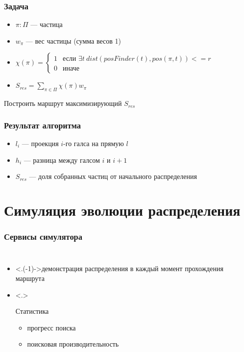\documentclass{beamer} %
\theoremstyle{definition} %
\begin{document}
\begin{frame}
  \frametitle{Задача}
\begin{itemize}
  \item {$\pi : \Pi$ --- частица}
  \item {$w_{\pi}$ --- вес частицы (сумма весов 1)}
  \item {$\chi(\pi) = 
	\left\{
		\begin{array}{ll}
			1 & \mbox{если } {\exists t\ {dist(posFinder(t), pos(\pi, t)) <= r}}\\
			0 & \mbox{иначе }
		\end{array}
	\right.$
        }
  \item {$S_{res}=\sum\limits_{\pi \in \Pi}{\chi(\pi)w_{\pi}}$}
\end{itemize}
  Построить маршрут максимизирующий $S_{res}$
\end{frame}

\begin{frame}
  \frametitle{Результат алгоритма}
\begin{itemize}
  \item $l_i$ --- проекция $i$-го галса на прямую $l$
  \item $h_i$ --- разница между галсом $i$ и $i+1$
  \item $S_{res}$ --- доля собранных частиц от начального распределения
\end{itemize}

\end{frame}

\section{Симуляция эволюции распределения} %
\begin{frame}
  \frametitle{Сервисы симулятора}
\begin{columns}
\begin{itemize}
\item<.(-1)->{демонстрация распределения в каждый момент прохождения маршрута}
\item<.>{Статистика
\begin{itemize}
  \item{\color{red} прогресс поиска}
  \item{\color{blue} поисковая производительность}
\end{itemize}
}
\end{itemize}
\end{columns}
\end{frame}
\end{document}
